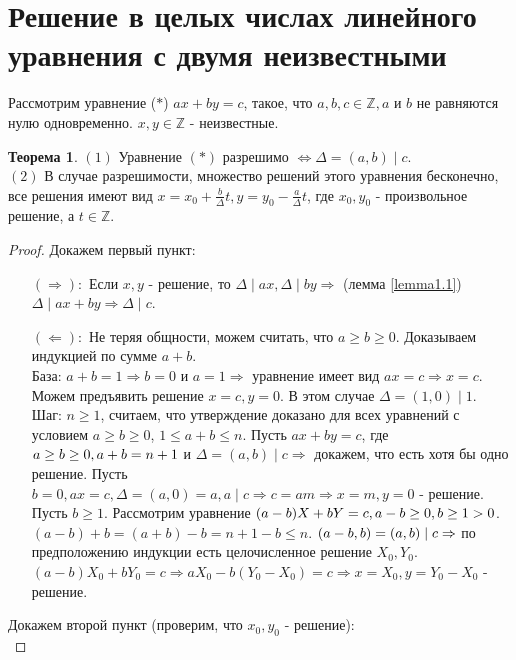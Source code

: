 \documentclass[a4paper, 12pt]{article}
\newcommand{\Z}{\mathbb{Z}}
\newcommand{\lra}{\Leftrightarrow}
\renewcommand{\div}{\mid}
\theoremstyle{definition}
\newtheorem{theorem}{Теорема}[section]
\begin{document}
    \section{Решение в целых числах линейного уравнения с двумя неизвестными}
    Рассмотрим уравнение ($*$) $ax+by=c$, такое, что $a,b,c\in \Z, a$ и $b$ не равняются нулю одновременно. $x,y\in \Z$ - неизвестные.
    \begin{theorem} \label{th4.1}
        $(1)$ Уравнение $(*)$ разрешимо $\lra \Delta = (a,b) \div c$.\\
        $(2)$ В случае разрешимости, множество решений этого уравнения бесконечно, все решения имеют вид $x=x_0+\frac{b}{\Delta}t, y=y_0-\frac{a}{\Delta}t$, где $x_0,y_0$ - произвольное решение, а $t\in \Z$.
    \end{theorem} 
    \begin{proof}
        Докажем первый пункт:
        \begin{itemize}
            \item[$(\Rightarrow):$] Если $x,y$ - решение, то $\Delta \div ax, \Delta \div by\Rightarrow$ (лемма \ref{lemma1.1}) $\Delta \div ax+by\Rightarrow \Delta \div c$.
            \item[$(\Leftarrow):$] Не теряя общности, можем считать, что $a\geq b\geq 0$. Доказываем индукцией по сумме $a+b$.\\
            База: $a+b=1\Rightarrow b=0$ и $a=1 \Rightarrow$ уравнение имеет вид $ax=c\Rightarrow x=c$. Можем предъявить решение $x=c, y=0$. В этом случае $\Delta = (1,0) \div 1$. \\
            Шаг: $n\geq 1$, считаем, что утверждение доказано для всех уравнений с условием $a\geq b\geq 0$, $1\leq a+b\leq n$. Пусть $ax+by=c$, где $a\geq b\geq 0,\\ a+b=n+1$ и $\Delta = (a,b) \div c \Rightarrow$ докажем, что есть хотя бы одно решение. Пусть $b=0, ax=c, \Delta = (a,0)=a, a\div c\Rightarrow c=am\Rightarrow x=m, y=0$ - решение. Пусть $b\geq 1$. Рассмотрим уравнение $(a-b)X+bY=c,\\ a-b\geq 0, b\geq 1 >0$. $(a-b)+b=(a+b)-b=n+1-b\leq n$. $(a-b, b)=(a,b) \div c\\ \Rightarrow$ по предположению индукции есть целочисленное решение $X_0,Y_0$. \\ $(a-b)X_0+bY_0=c\Rightarrow aX_0-b(Y_0-X_0) = c \Rightarrow x=X_0, y=Y_0-X_0$ - решение.
        \end{itemize}
        Докажем второй пункт (проверим, что $x_0,y_0$ - решение):\\

\end{proof}
\end{document}
